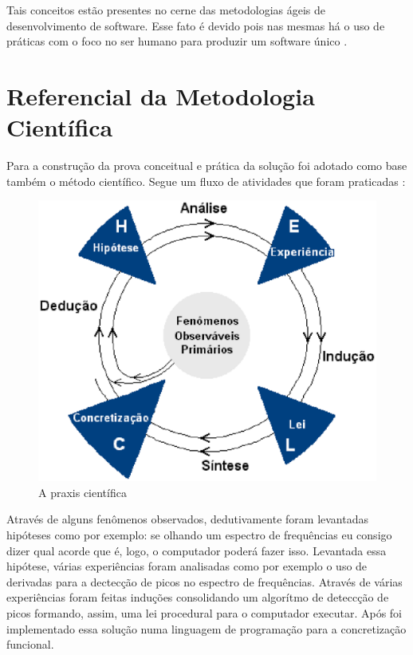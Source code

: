 Tais conceitos estão presentes no cerne das metodologias ágeis de desenvolvimento de software. Esse fato é devido pois nas mesmas há o uso de práticas com o foco no ser humano para produzir um software único \cite{agile}.

\section{Referencial da Metodologia Científica}
\label{sec:referencialmetodocientifico}

Para a construção da prova conceitual e prática da solução foi adotado como base também o método científico. Segue um fluxo de atividades que foram praticadas \cite{metodo}:

\begin{figure}[h]
	\centering
		\includegraphics[keepaspectratio=true,scale=0.7]{figuras/metodologia.eps}
	\caption{A praxis científica}
\end{figure}

Através de alguns fenômenos observados, dedutivamente foram levantadas hipóteses como por exemplo: se olhando um espectro de frequências eu consigo dizer qual acorde que é, logo, o computador poderá fazer isso. Levantada essa hipótese, várias experiências foram analisadas como por exemplo o uso de derivadas para a dectecção de picos no espectro de frequências. Através de várias experiências foram feitas induções consolidando um algorítmo de deteccção de picos formando, assim, uma lei procedural para o computador executar. Após foi implementado essa solução numa linguagem de programação para a concretização funcional.

